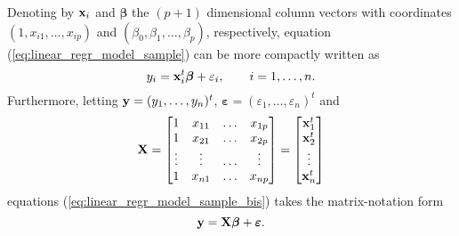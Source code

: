 Denoting by $\mathbf x_{i}$ and $\boldsymbol\beta$ the $(p+1)$ dimensional
column vectors with coordinates $(1, x_{i1}, \dots, x_{ip})$ and $(\beta_{0},
\beta_{1}, \dots, \beta_{p})$, respectively, equation
(\ref{eq:linear_regr_model_sample}) can be more compactly written as
%
\begin{equation}
    \label{eq:linear_regr_model_sample_bis}
    y_{i} = \mathbf x_{i}^t\boldsymbol\beta + \varepsilon_{i},
    \qquad i = 1, \dots, n.
\end{equation}
%
Furthermore, letting $\mathbf y = (y_{1}, \dots, y_{n})^t$,
$\boldsymbol\varepsilon = (\varepsilon_{1}, \dots, \varepsilon_{n})^t$ and
\[
    \mathbf X = 
    \begin{bmatrix}
        1       & x_{11} & \dots & x_{1p} \\
        1       & x_{21} & \dots & x_{2p} \\
        \vdots  & \vdots & \dots & \vdots \\
        1       & x_{n1} & \dots & x_{np}
    \end{bmatrix}
    = 
    \begin{bmatrix}
        \mathbf x_{1}^t \\
        \mathbf x_{2}^t \\
        \vdots         \\
        \mathbf x_{n}^t
    \end{bmatrix}
\]
equations (\ref{eq:linear_regr_model_sample_bis}) takes the matrix-notation form
\[
    \mathbf y = \mathbf X\boldsymbol\beta + \boldsymbol\varepsilon.
\]

